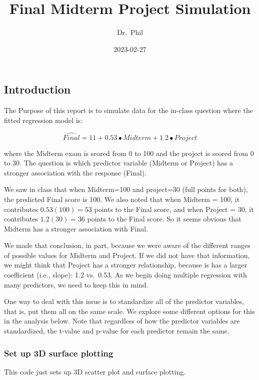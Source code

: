 \documentclass[
]{article}
\title{Final Midterm Project Simulation}
\author{Dr.~Phil}
\date{2023-02-27}
\begin{document}
\maketitle

\hypertarget{introduction}{%
\subsection{Introduction}\label{introduction}}

The Purpose of this report is to simulate data for the in-class question
where the fitted regression model is:

\[ \hat{Final} = 11 + 0.53 \bullet Midterm + 1.2 \bullet Project\]

where the Midterm exam is scored from 0 to 100 and the project is scored
from 0 to 30. The question is which predictor variable (Midterm or
Project) has a stronger association with the response (Final).

We saw in class that when Midterm=100 and project=30 (full points for
both), the predicted Final score is 100. We also noted that when Midterm
= 100, it contributes \(0.53(100)=53\) points to the Final score, and
when Project = 30, it contributes \(1.2(30)=36\) points to the Final
score. So it seems obvious that Midterm has a stronger association with
Final.

We made that conclusion, in part, because we were aware of the different
ranges of possible values for Midterm and Project. If we did not have
that information, we might think that Project has a stronger
relationship, because is has a larger coefficient (i.e., slope): 1.2
vs.~0.53. As we begin doing multiple regression with many predictors, we
need to keep this in mind.

One way to deal with this issue is to standardize all of the predictor
variables, that is, put them all on the same scale. We explore some
different options for this in the analysis below. Note that regardless
of how the predictor variables are standardized, the t-value and p-value
for each predictor remain the same.

\hypertarget{set-up-3d-surface-plotting}{%
\subsubsection{Set up 3D surface
plotting}\label{set-up-3d-surface-plotting}}

This code just sets up 3D scatter plot and surface plotting.
\end{document}
